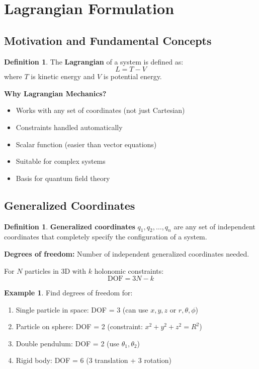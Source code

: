\documentclass[12pt,a4paper]{article}
\theoremstyle{definition}
\newtheorem{definition}[theorem]{Definition}
\newtheorem{example}[theorem]{Example}
\begin{document}
\newpage
\section{Lagrangian Formulation}

\subsection{Motivation and Fundamental Concepts}

\begin{definition}
The \textbf{Lagrangian} of a system is defined as:
\[
L = T - V
\]
where $T$ is kinetic energy and $V$ is potential energy.
\end{definition}

\begin{importantbox}
\textbf{Why Lagrangian Mechanics?}
\begin{itemize}
    \item Works with any set of coordinates (not just Cartesian)
    \item Constraints handled automatically
    \item Scalar function (easier than vector equations)
    \item Suitable for complex systems
    \item Basis for quantum field theory
\end{itemize}
\end{importantbox}

\subsection{Generalized Coordinates}

\begin{definition}
\textbf{Generalized coordinates} $q_1, q_2, \ldots, q_n$ are any set of independent coordinates that completely specify the configuration of a system.

\textbf{Degrees of freedom:} Number of independent generalized coordinates needed.

For $N$ particles in 3D with $k$ holonomic constraints:
\[
\text{DOF} = 3N - k
\]
\end{definition}

\begin{example}
Find degrees of freedom for:
\begin{enumerate}
    \item Single particle in space: DOF = 3 (can use $x, y, z$ or $r, \theta, \phi$)
    \item Particle on sphere: DOF = 2 (constraint: $x^2 + y^2 + z^2 = R^2$)
    \item Double pendulum: DOF = 2 (use $\theta_1, \theta_2$)
    \item Rigid body: DOF = 6 (3 translation + 3 rotation)
\end{enumerate}
\end{example}
\end{document}
